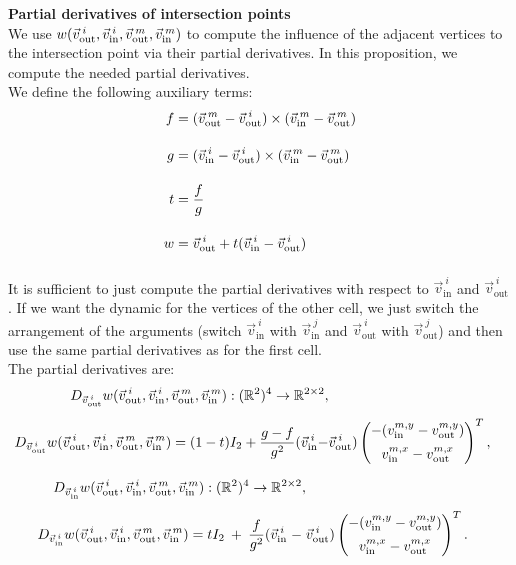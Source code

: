 \begin{proposition} \textbf{Partial derivatives of intersection points} \\
	We use $w(\vec{v}_{\text{out}}^{\: i}, \vec{v}_{\text{in}}^{\: i}, \vec{v}_{\text{out}}^{\: m}, \vec{v}_{\text{in}}^{\: m})$ to compute the influence of the adjacent vertices to the intersection point via their partial derivatives.
	In this proposition, we compute the needed partial derivatives. \\
	We define the following auxiliary terms:
	\begin{align*}
		f &= (\vec{v}_{\text{out}}^{\: m} - \vec{v}_{\text{out}}^{\: i}) \times (\vec{v}_{\text{in}}^{\: m} - \vec{v}_{\text{out}}^{\: m}) \\[1em]
		g &= (\vec{v}_{\text{in}}^{\: i} - \vec{v}_{\text{out}}^{\: i}) \times (\vec{v}_{\text{in}}^{\: m} - \vec{v}_{\text{out}}^{\: m})\\[1em]
		t &= \frac{f}{g} \\[1em]
		w &= \vec{v}_{\text{out}}^{\: i} + t(\vec{v}_{\text{in}}^{\: i} - \vec{v}_{\text{out}}^{\: i}) \\[1em]
	\end{align*}
	It is sufficient to just compute the partial derivatives with respect to $\vec{v}_{\text{in}}^{\: i}$ and $\vec{v}_{\text{out}}^{\: i}$.
	If we want the dynamic for the vertices of the other cell, we just switch the arrangement of the arguments (switch $\vec{v}_{\text{in}}^{\: i}$ with $\vec{v}_{\text{in}}^{\: j}$ and $\vec{v}_{\text{out}}^{\: i}$ with $\vec{v}_{\text{out}}^{\: j}$) and then use the same partial derivatives as for the first cell. \\
	The partial derivatives are: 
	\begin{align}
		\begin{split}
			D_{\vec{v}_{\text{out}}^{\: i}} w(\vec{v}_{\text{out}}^{\: i}, \vec{v}_{\text{in}}^{\: i}, \vec{v}_{\text{out}}^{\: m}, \vec{v}_{\text{in}}^{\: m}): (\mathbb{R}^2)^4 \rightarrow \mathbb{R}^{2 \times 2}, \\[0.5em]
			D_{\vec{v}_{\text{out}}^{\: i}} w(\vec{v}_{\text{out}}^{\: i}, \vec{v}_{\text{in}}^{\: i}, \vec{v}_{\text{out}}^{\: m}, \vec{v}_{\text{in}}^{\: m}) = (1-t)I_2 + \dfrac{g - f}{g^2}(\vec{v}_{\text{in}}^{\: i} - &\vec{v}_{\text{out}}^{\: i}) \begin{pmatrix}
			-(v_{\text{in}}^{m, y} - v_{\text{out}}^{m, y}) \\[0.5em]
			 v_{\text{in}}^{m, x} - v_{\text{out}}^{m, x}
		\end{pmatrix}^T,
		\end{split}
		\label{equ:dwv_out}
	\end{align}

	\begin{align}
		\begin{split}
			D_{\vec{v}_{\text{in}}^{\: i}} w(\vec{v}_{\text{out}}^{\: i}, \vec{v}_{\text{in}}^{\: i}, \vec{v}_{\text{out}}^{\: m}, \vec{v}_{\text{in}}^{\: m}): (\mathbb{R}^2)^4 \rightarrow \mathbb{R}^{2 \times 2}, \\[0.5em]
			D_{\vec{v}_{\text{in}}^{\: i}} w(\vec{v}_{\text{out}}^{\: i}, \vec{v}_{\text{in}}^{\: i}, \vec{v}_{\text{out}}^{\: m}, \vec{v}_{\text{in}}^{\: m}) = t I_2 \:+\: \dfrac{f}{g^2}(\vec{v}_{\text{in}}^{\: i} \;-\; &\vec{v}_{\text{out}}^{\: i}) \begin{pmatrix}
			-(v_{\text{in}}^{m, y} - v_{\text{out}}^{m, y}) \\[0.5em]
			 v_{\text{in}}^{m, x} - v_{\text{out}}^{m, x}
		\end{pmatrix}^T.
		\end{split}
		\label{equ:dwv_in}
	\end{align}


\end{proposition}
